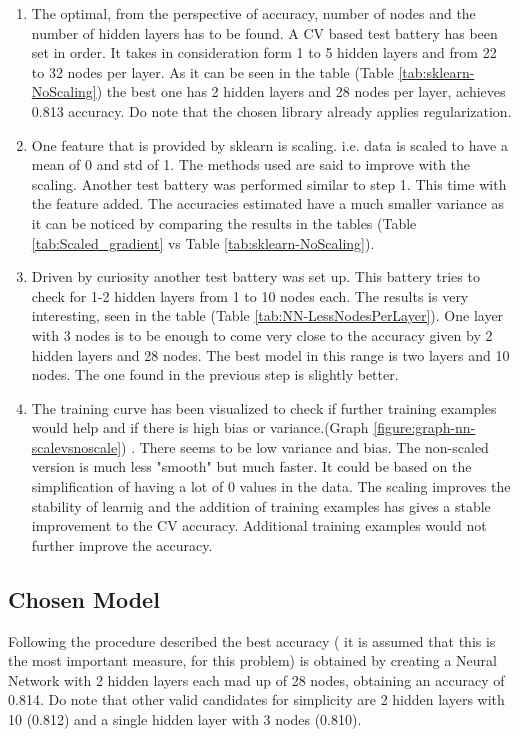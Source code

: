 \documentclass{article}
\begin{document}
\begin{enumerate}
	\item The optimal, from the perspective of accuracy, number of nodes and the number of hidden layers has to be found. A CV based test battery has been set in order. It takes in consideration form 1 to 5 hidden layers and from 22 to 32 nodes per layer. As it can be seen in the table (Table \ref{tab:sklearn-NoScaling}) the best one has 2 hidden layers and 28 nodes per layer, achieves 0.813 accuracy. Do note that the chosen library already applies regularization.
	
	\item One feature that is provided by sklearn is scaling. i.e. data is scaled to have a mean of 0 and std of 1. The methods used are said to improve with the scaling. Another test battery was performed similar to step 1. This time with the feature added. The accuracies estimated have a much smaller variance as it can be noticed by comparing the results in the tables (Table \ref{tab:Scaled_gradient} vs Table  \ref{tab:sklearn-NoScaling}).
	
	\item Driven by curiosity another test battery was set up. This battery tries to check for 1-2 hidden layers from 1 to 10 nodes each. The results is very interesting, seen in the table (Table \ref{tab:NN-LessNodesPerLayer}). One layer with 3 nodes is to be enough to come very close to the accuracy given by 2 hidden layers and 28 nodes. The best model in this range is two layers and 10 nodes. The one found in the previous step is slightly better.
	
	\item The training curve has been visualized to check if further training examples would help and if there is high bias or variance.(Graph  \ref{figure:graph-nn-scalevsnoscale}) . There seems to be low variance and bias. The non-scaled version is much less "smooth" but much faster. It could be based on the simplification of having a lot of 0 values in the data. The scaling improves the stability of learnig and the addition of training examples has gives a stable improvement to the CV accuracy. Additional training examples would not further improve the accuracy.
	
\end{enumerate}


\subsection{Chosen Model}
Following the procedure described the best accuracy ( it is assumed that this is the most important measure, for this problem) is obtained by creating a Neural Network with 2 hidden layers each mad up of 28 nodes, obtaining an accuracy of 0.814. Do note that other valid candidates for simplicity are 2 hidden layers with 10 (0.812) and a single hidden layer with 3 nodes (0.810).
\end{document}
